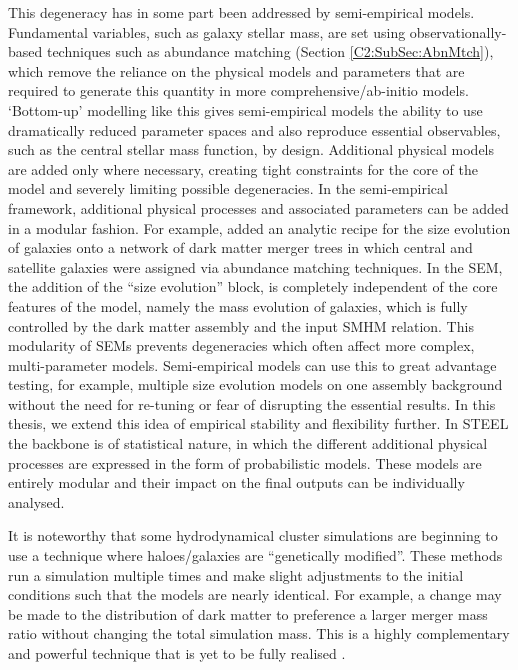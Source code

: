 This degeneracy has in some part been addressed by semi-empirical models. Fundamental variables, such as galaxy stellar mass, are set using observationally-based techniques such as abundance matching (Section \ref{C2:SubSec:AbnMtch}), which remove the reliance on the physical models and parameters that are required to generate this quantity in more comprehensive/ab-initio models. `Bottom-up' modelling like this gives semi-empirical models the ability to use dramatically reduced parameter spaces and also reproduce essential observables, such as the central stellar mass function, by design. Additional physical models are added only where necessary, creating tight constraints for the core of the model and severely limiting possible degeneracies. In the semi-empirical framework, additional physical processes and associated parameters can be added in a modular fashion. For example, \citet{Shankar2014} added an analytic recipe for the size evolution of galaxies onto a network of dark matter merger trees in which central and satellite galaxies were assigned via abundance matching techniques. In the \citet{Shankar2014} SEM, the addition of the ``size evolution'' block, is completely independent of the core features of the model, namely the mass evolution of galaxies, which is fully controlled by the dark matter assembly and the input SMHM relation. This modularity of SEMs prevents degeneracies which often affect more complex, multi-parameter models. Semi-empirical models can use this to great advantage testing, for example, multiple size evolution models on one assembly background without the need for re-tuning or fear of disrupting the essential results. In this thesis, we extend this idea of empirical stability and flexibility further. In STEEL the backbone is of statistical nature, in which the different additional physical processes are expressed in the form of probabilistic models. These models are entirely modular and their impact on the final outputs can be individually analysed. 

It is noteworthy that some hydrodynamical cluster simulations are beginning to use a technique where haloes/galaxies are ``genetically modified''. These methods run a simulation multiple times and make slight adjustments to the initial conditions such that the models are nearly identical. For example, a change may be made to the distribution of dark matter to preference a larger merger mass ratio without changing the total simulation mass. This is a highly complementary and powerful technique that is yet to be fully realised \cite{Rey2018QuadraticHistory}.

